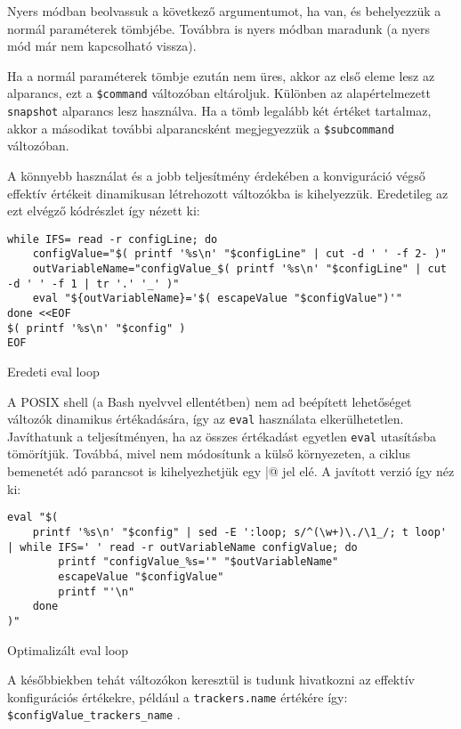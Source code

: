 \documentclass[
]{elteikthesis}[2025/03/25]
\begin{document}
Nyers módban beolvassuk a következő argumentumot, ha van,
és behelyezzük a normál paraméterek tömbjébe.
Továbbra is nyers módban maradunk
(a nyers mód már nem kapcsolható vissza).

Ha a normál paraméterek tömbje ezután nem üres, akkor az első eleme lesz az alparancs,
ezt a \verb|$command| változóban eltároljuk.
Különben az alapértelmezett \verb|snapshot| alparancs lesz használva.
Ha a tömb legalább két értéket tartalmaz, akkor a másodikat további alparancsként
megjegyezzük a \verb|$subcommand| változóban.

A könnyebb használat és a jobb teljesítmény érdekében a konviguráció végső effektív értékeit
dinamikusan létrehozott változókba is kihelyezzük.
Eredetileg az ezt elvégző kódrészlet így nézett ki:

\begin{listing}[H]
\begin{verbatim}
while IFS= read -r configLine; do
    configValue="$( printf '%s\n' "$configLine" | cut -d ' ' -f 2- )"
    outVariableName="configValue_$( printf '%s\n' "$configLine" | cut -d ' ' -f 1 | tr '.' '_' )"
    eval "${outVariableName}='$( escapeValue "$configValue")'"
done <<EOF
$( printf '%s\n' "$config" )
EOF
\end{verbatim}
\caption{Eredeti eval loop}
\end{listing}

A POSIX shell (a Bash nyelvvel ellentétben) nem ad beépített lehetőséget változók dinamikus értékadására,
így az \verb|eval| használata elkerülhetetlen.
Javíthatunk a teljesítményen, ha az összes értékadást egyetlen \verb|eval| utasításba tömörítjük.
Továbbá, mivel nem módosítunk a külső környezeten,
a ciklus bemenetét adó parancsot is kihelyezhetjük egy \verb@|@ jel elé.
A javított verzió így néz ki:

\begin{listing}[H]
\begin{verbatim}
eval "$(
    printf '%s\n' "$config" | sed -E ':loop; s/^(\w+)\./\1_/; t loop' | while IFS=' ' read -r outVariableName configValue; do
        printf "configValue_%s='" "$outVariableName"
        escapeValue "$configValue"
        printf "'\n"
    done
)"
\end{verbatim}
\caption{Optimalizált eval loop}
\end{listing}

A későbbiekben tehát változókon keresztül is tudunk hivatkozni az effektív konfigurációs értékekre,
például a \verb|trackers.name| értékére így: \verb|$configValue_trackers_name| .
\end{document}
